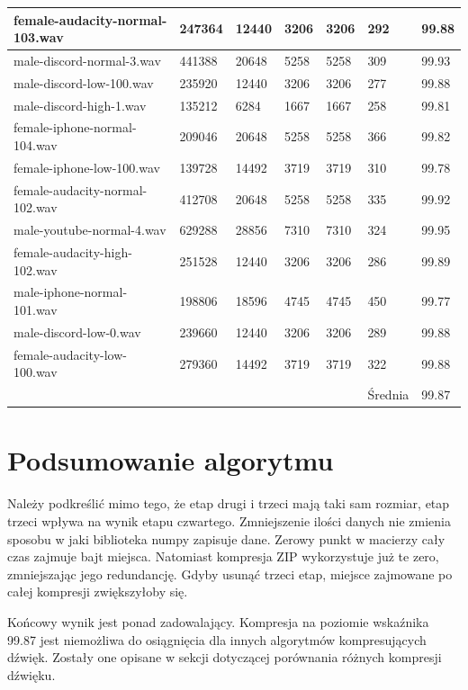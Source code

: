 \documentclass[a4paper,12pt]{extarticle}
\begin{document}
\begin{table}[!ht]
{\begin{tabular}{|l|l|l|l|l|l|l|}
        female-audacity-normal-103.wav & 247364 & 12440 & 3206 & 3206 & 292 & 99.88 \\ \hline
        male-discord-normal-3.wav & 441388 & 20648 & 5258 & 5258 & 309 & 99.93 \\ \hline
        male-discord-low-100.wav & 235920 & 12440 & 3206 & 3206 & 277 & 99.88 \\ \hline
        male-discord-high-1.wav & 135212 & 6284 & 1667 & 1667 & 258 & 99.81 \\ \hline
        female-iphone-normal-104.wav & 209046 & 20648 & 5258 & 5258 & 366 & 99.82 \\ \hline
        female-iphone-low-100.wav & 139728 & 14492 & 3719 & 3719 & 310 & 99.78 \\ \hline
        female-audacity-normal-102.wav & 412708 & 20648 & 5258 & 5258 & 335 & 99.92 \\ \hline
        male-youtube-normal-4.wav & 629288 & 28856 & 7310 & 7310 & 324 & 99.95 \\ \hline
        female-audacity-high-102.wav & 251528 & 12440 & 3206 & 3206 & 286 & 99.89 \\ \hline
        male-iphone-normal-101.wav & 198806 & 18596 & 4745 & 4745 & 450 & 99.77 \\ \hline
        male-discord-low-0.wav & 239660 & 12440 & 3206 & 3206 & 289 & 99.88 \\ \hline
        female-audacity-low-100.wav & 279360 & 14492 & 3719 & 3719 & 322 & 99.88 \\ \hline
        ~ & ~ & ~ & ~ & ~ & Średnia & 99.87 \\ \hline
    \end{tabular}}
\end{table}

\restoregeometry

\clearpage

\section*{Podsumowanie algorytmu}

Należy podkreślić mimo tego, że etap drugi i trzeci mają taki sam rozmiar, etap trzeci wpływa na wynik etapu czwartego. Zmniejszenie ilości danych nie zmienia sposobu w jaki biblioteka numpy zapisuje dane. Zerowy punkt w macierzy cały czas zajmuje bajt miejsca. Natomiast kompresja ZIP wykorzystuje już te zero, zmniejszając jego redundancję. Gdyby usunąć trzeci etap, miejsce zajmowane po całej kompresji zwiększyłoby się.

Końcowy wynik jest ponad zadowalający. Kompresja na poziomie wskaźnika 99.87 jest niemożliwa do osiągnięcia dla innych algorytmów kompresujących dźwięk. Zostały one opisane w sekcji dotyczącej porównania różnych kompresji dźwięku.

\clearpage

\printbibliography[title=Bibliografia]
\end{document}
